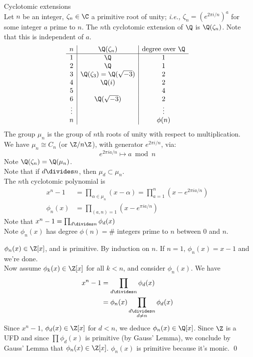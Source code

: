 Cyclotomic extensions \\
Let $n$ be an integer, $\zeta_n\in\C$ a primitive root of unity; \textit{i.e.,} $\zeta_n=(e^{2\pi i/n})^a$ for some integer $a$ prime to $n$.  The $n$th cyclotomic extension of $\Q$ is $\Q(\zeta_n)$.  Note that this is independent of $a$.
\[ \begin{array}{c|c|c}
n & \Q(\zeta_n) & \text{degree over $\Q$} \\ \hline
1 & \Q & 1 \\
2 & \Q & 1 \\
3 & \Q(\zeta_3) = \Q(\sqrt{-3}) & 2 \\
4 & \Q(i) & 2 \\
5 & & 4 \\
6 & \Q(\sqrt{-3}) & 2 \\
\vdots & & \vdots \\
n & & \phi(n)
\end{array} \]
 The group $\mu_n$ is the group of $n$th roots of unity with respect to multiplication. \\
We have $\mu_n\cong C_n$ (or $\Z/n\Z$), with generator $e^{2\pi i/n}$, via:
\[ e^{2\pi i a/n} \mapsto a \bmod n \]
Note $\Q(\zeta_n)=\Q(\mu_n)$. \\
Note that if $d\divides n$, then $\mu_d\subset\mu_n$. \\
 The $n$th cyclotomic polynomial is
\begin{align*}
x^n-1 &= \prod_{\alpha\in\mu_n}(x-\alpha)=\prod_{a=1}^n(x-e^{2\pi ia/n}) \\
\phi_n(x) &= \prod_{(a,n)=1}(x-e^{\pi ia/n})
\end{align*}
Note that $x^n-1=\prod_{d\divides n}\phi_d(x)$ \\
Note $\phi_n(x)$ has degree $\phi(n)={}$\# integers prime to $n$ between $0$ and $n$.

\thm $\phi_n(x)\in\Z[x]$, and is primitive.
\pf By induction on $n$.  If $n=1$, $\phi_n(x)=x-1$ and we're done. \\
Now assume $\phi_k(x)\in\Z[x]$ for all $k<n$, and consider $\phi_n(x)$.  We have
\begin{align*}
x^n-1 &= \prod_{d\divides n}\phi_d(x) \\
&= \phi_n(x) \prod_{\substack{d\divides n\\d\neq n}}\phi_d(x)
\end{align*}
Since $x^n-1$, $\phi_d(x)\in\Z[x]$ for $d<n$, we deduce $\phi_n(x)\in\Q[x]$.  Since $\Z$ is a UFD and since $\prod\phi_d(x)$ is primitive (by Gauss' Lemma), we conclude by Gauss' Lemma that $\phi_n(x)\in\Z[x]$.  $\phi_n(x)$ is primitive because it's monic. \qed

